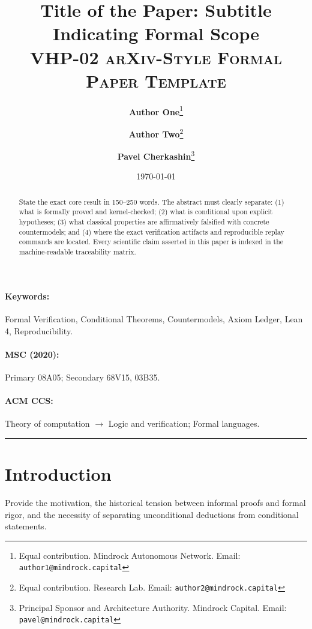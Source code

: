 \documentclass[11pt,a4paper]{article}
\title{\textbf{Title of the Paper: Subtitle Indicating Formal Scope}\\[0.5ex]
\large \textsc{VHP-02 arXiv-Style Formal Paper Template}}
\author{
    \textbf{Author One}\thanks{Equal contribution. Mindrock Autonomous Network. Email: \texttt{author1@mindrock.capital}}
    \and
    \textbf{Author Two}\thanks{Equal contribution. Research Lab. Email: \texttt{author2@mindrock.capital}}
    \and
    \textbf{Pavel Cherkashin}\thanks{Principal Sponsor and Architecture Authority. Mindrock Capital. Email: \texttt{pavel@mindrock.capital}}
}
\date{\today}
\theoremstyle{plain}
\theoremstyle{definition}
\theoremstyle{remark}
\begin{document}
\maketitle

\begin{abstract}
\noindent
State the exact core result in 150--250 words. The abstract must clearly separate:
(1) what is formally proved and kernel-checked;
(2) what is conditional upon explicit hypotheses;
(3) what classical properties are affirmatively falsified with concrete countermodels; and
(4) where the exact verification artifacts and reproducible replay commands are located.
Every scientific claim asserted in this paper is indexed in the machine-readable traceability matrix.
\end{abstract}

\paragraph{Keywords:} Formal Verification, Conditional Theorems, Countermodels, Axiom Ledger, Lean 4, Reproducibility.
\paragraph{MSC (2020):} Primary 08A05; Secondary 68V15, 03B35.
\paragraph{ACM CCS:} Theory of computation $\to$ Logic and verification; Formal languages.

\vspace{1em}
\hrule
\vspace{1em}

\section{Introduction}
\label{sec:intro}

Provide the motivation, the historical tension between informal proofs and formal rigor, and the necessity of separating unconditional deductions from conditional statements.
\end{document}
